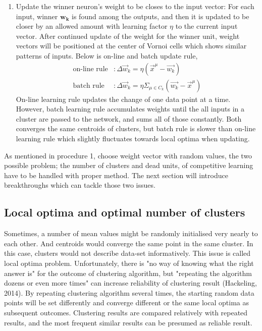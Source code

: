 \documentclass[12pt,a4paper]{report}
\begin{document}
\begin{enumerate}
\item Update the winner neuron's weight to be closes to the input vector: \newline
For each input, winner $\mathbf{w_k}$ is found among the outputs, and then it is updated to be closer by an allowed amount with learning factor $\eta$ to the current input vector. After continued update of the weight for the winner unit, weight vectors will be positioned at the center of Vornoi cells which shows similar patterns of inputs. Below is on-line and batch update rule,
	\begin{equation} \label{eq:on-line and batch}
	\begin{split}
	    \text{on-line rule}&: \Delta \vec{w}_k = \eta(\vec{x}^\mu - \vec{w_k})\\
	    \text{batch rule}&:\Delta \vec{w}_k = \eta \Sigma_{\mu \in C_k} (\vec{w_k} - \vec{x}^\mu)
	\end{split}
	\end{equation}
On-line learning rule updates the change of one data point at a time. However, batch learning rule accumulates weights until the all inputs in a cluster are passed to the network, and sums all of those constantly. Both converges the same centroids of clusters, but batch rule is slower than on-line learning rule which slightly fluctuates towards local optima when updating.
\end{enumerate}

As mentioned in procedure 1, choose weight vector with random values, the two possible problem; the number of clusters and dead units, of competitive learning have to be handled with proper method. The next section will introduce breakthroughs which can tackle those two issues.
\subsection{Local optima and optimal number of clusters}

Sometimes, a number of mean values might be randomly initialised very nearly to each other. And centroids would converge the same point in the same cluster. In this case, clusters would not describe data-set informatively. This issue is called local optima problem. Unfortunately, there is "no way of knowing what the right answer is" for the outcome of clustering algorithm, but "repeating the algorithm dozens or even more times" can increase reliability of clustering result (Hackeling, 2014). By repeating clustering algorithm several times, the starting random data points will be set differently and converge different or the same local optima as subsequent outcomes. Clustering results are compared relatively with repeated results, and the most frequent similar results can be presumed as reliable result.
\end{document}

